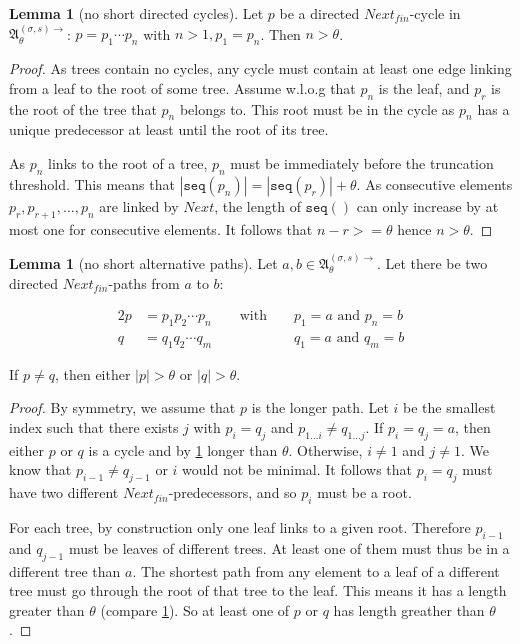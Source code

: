 \documentclass[draft]{scrartcl}
\theoremstyle{definition}
\newtheorem{lemma}[theorem]{Lemma}
\newcommand{\seq}[1]{\mathtt{seq}({#1})}
\begin{document}
\begin{lemma}[no short directed cycles]\label{lem:no-short-cycles}
  Let $p$ be a directed $\mathit{Next}_{fin}$-cycle in $\mathfrak{A}^{(\sigma, s) \rightarrow}_{\theta}$: $p = p_{1}\cdots{} p_{n}$ with $n > 1, p_{1} = p_{n}$.
  Then $n > \theta$.
\end{lemma}
\begin{proof}
  As trees contain no cycles, any cycle must contain at least one edge linking from a leaf to the root of some tree.
  Assume w.l.o.g that $p_{n}$ is the leaf, and $p_{r}$ is the root of the tree that $p_{n}$ belongs to.
  This root must be in the cycle as $p_{n}$ has a unique predecessor at least until the root of its tree.

  As $p_{n}$ links to the root of a tree, $p_{n}$ must be immediately before the truncation threshold.
  This means that $|\seq{p_{n}}| = |\seq{p_{r}}| + \theta$.
  As consecutive elements $p_{r}, p_{r+1}, \ldots, p_{n}$ are linked by $\mathit{Next}$, the length of $\seq{}$ can only increase by at most one for consecutive elements.
  It follows that $n - r >= \theta$ hence $n > \theta$.
\end{proof}

\begin{lemma}[no short alternative paths]
  Let $a, b \in \mathfrak{A}^{(\sigma, s) \rightarrow}_{\theta}$.
  Let there be two directed $\mathit{Next}_{fin}$-paths from $a$ to $b$:

  \begin{alignat*}{2}
    p &= p_{1} p_{2} \cdots{} p_{n} \qquad\text{with }&&\text{$p_{1} = a$ and $p_{n} = b$}\\
    q &= q_{1} q_{2} \cdots{} q_{m} && \text{$q_{1} = a$ and $q_{m} = b$}
  \end{alignat*}

  If $p \neq q$, then either $|p| > \theta$ or $|q| > \theta$.
\end{lemma}
\begin{proof}
  By symmetry, we assume that $p$ is the longer path.
  Let $i$ be the smallest index such that there exists $j$ with $p_{i} = q_{j}$ and $p_{1\ldots{}i} \neq q_{1\ldots{}j}$.
  If $p_{i} = q_{j} = a$, then either $p$ or $q$ is a cycle and by \cref{lem:no-short-cycles} longer than $\theta$.
  Otherwise, $i \neq 1$ and $j \neq 1$.
  We know that $p_{i-1} \neq q_{j-1}$ or $i$ would not be minimal.
  It follows that $p_{i} = q_{j}$ must have two different $\mathit{Next}_{fin}$-predecessors, and so $p_{i}$ must be a root.

  For each tree, by construction only one leaf links to a given root.
  Therefore $p_{i-1}$ and $q_{j-1}$ must be leaves of different trees.
  At least one of them must thus be in a different tree than $a$.
  The shortest path from any element to a leaf of a different tree must go through the root of that tree to the leaf.
  This means it has a length greater than $\theta$ (compare \cref{lem:no-short-cycles}).
  So at least one of $p$ or $q$ has length greather than $\theta$.
\end{proof}
\end{document}
